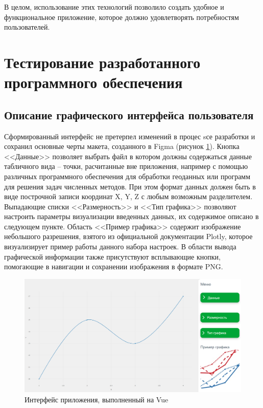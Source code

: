 В целом, использование этих технологий позволило создать удобное и функциональное приложение, которое должно удовлетворять потребностям пользователей.
\section{Тестирование разработанного программного обеспечения}
\subsection{Описание графического интерфейса пользователя}
Сформированный интерфейс не претерпел изменений в процес sсе разработки и сохранил основные черты макета, созданного в Figma (рисунок \ref{fig:12}). Кнопка <<Данные>> позволяет выбрать файл в котором должны содержаться данные табличного вида -- точки, расчитанные вне приложения, например с помощью различных программного обеспечения для обработки геоданных или программ для решения задач численных методов. При этом формат данных должен быть в виде построчной записи координат X, Y, Z с любым возможным разделителем. Выпадающие списки <<Размерность>> и <<Тип графика>> позволяют настроить параметры визуализации введенных данных, их содержимое описано в следующем пункте. Область <<Пример графика>> содержит изображение небольшого разрешения, взятого из официальной документации Plotly, которое визуализирует пример работы данного набора настроек. В области вывода графической информации также присутствуют всплывающие кнопки, помогающие в навигации и сохранении изображения в формате PNG.
\begin{figure}[h!]
    \center
    \includegraphics[scale=0.35]{fig/Interface.png}
    \caption{Интерфейс приложения, выполненный на Vue}
    \label{fig:12}
\end{figure}

